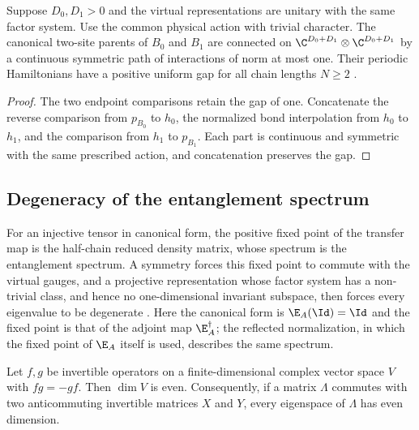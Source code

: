 \begin{definition}
    \label{def:spt_embedded_canonical_parent_path}
    \leanok
    Suppose $D_0,D_1>0$ and the virtual representations are unitary
    with the same factor system. Use the common physical action with
    trivial character. The canonical two-site parents of $B_0$ and
    $B_1$ are connected on $\C^{D_0+D_1}\otimes\C^{D_0+D_1}$ by a
    continuous symmetric path of interactions of norm at most one.
    Their periodic Hamiltonians have a positive uniform gap for all
    chain lengths $N\geq2$ \cite[Section~II.F.2]{Schuch2011Phases}.
\end{definition}

\begin{proof}\leanok
    The two endpoint comparisons retain the gap of one. Concatenate
    the reverse comparison from $p_{B_0}$ to $h_0$, the normalized
    bond interpolation from $h_0$ to $h_1$, and the comparison from
    $h_1$ to $p_{B_1}$. Each part is continuous and symmetric with
    the same prescribed action, and concatenation preserves the gap.
\end{proof}

\subsection{Degeneracy of the entanglement spectrum}
\label{sec:spt_entanglement_spectrum}

For an injective tensor in canonical form, the positive fixed point of the
transfer map is the half-chain reduced density matrix, whose spectrum is the
entanglement spectrum.  A symmetry forces this fixed point to commute with the
virtual gauges, and a projective representation whose factor system has a
non-trivial class, and hence no one-dimensional invariant subspace, then forces
every eigenvalue to be degenerate \cite[Section~III.A]{Cirac2021Matrix}.  Here the
canonical form is $\E_A(\Id)=\Id$ and the fixed point is that of the adjoint
map $\E_A^\dagger$; the reflected normalization, in which the fixed point of
$\E_A$ itself is used, describes the same spectrum.

\begin{lemma}
    \label{lem:even_finrank_of_anticommute}
    \leanok
    Let $f,g$ be invertible operators on a finite-dimensional complex vector
    space $V$ with $fg=-gf$.  Then $\dim V$ is even.  Consequently, if a matrix
    $\Lambda$ commutes with two anticommuting invertible matrices $X$ and $Y$,
    every eigenspace of $\Lambda$ has even dimension.
\end{lemma}

